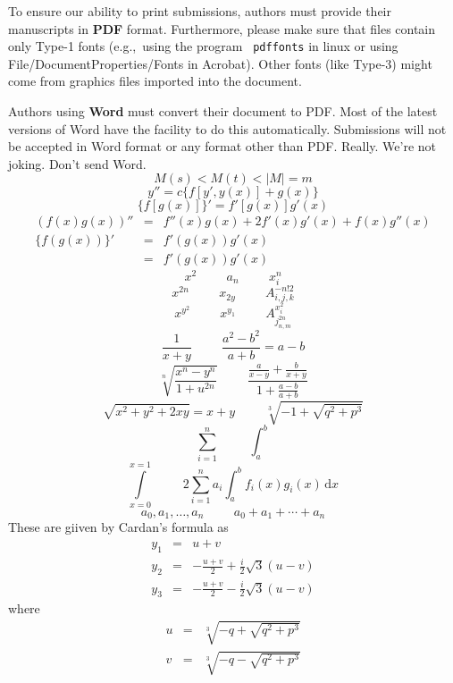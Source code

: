 \documentclass{article}
\begin{document}
\medskip

To ensure our ability to print submissions, authors must provide their
manuscripts in \textbf{PDF} format.  Furthermore, please make sure
that files contain only Type-1 fonts (e.g.,~using the program {\tt
  pdffonts} in linux or using File/DocumentProperties/Fonts in
Acrobat).  Other fonts (like Type-3) might come from graphics files
imported into the document.

Authors using \textbf{Word} must convert their document to PDF.  Most
of the latest versions of Word have the facility to do this
automatically.  Submissions will not be accepted in Word format or any
format other than PDF. Really. We're not joking. Don't send Word.
\[M(s)<M(t)<|M|=m\]
\[y''=c\{f[y',y(x)]+g(x)\}\]\vspace{5pt}
\[\{f[g(x)]\}'=f'[g(x)]g'(x)\]
\begin{eqnarray}
(f(x)g(x))'' &=& f''(x)g(x)+2f'(x)g'(x)+f(x)g''(x)\nonumber\\
 \{f(g(x))\}'&=& f'(g(x))g'(x)\nonumber\\
             &=& f'(g(x))g'(x)\nonumber
\end{eqnarray}
\[x^2\hspace{1cm}a_n\hspace{1cm}x^n_i\]
\[x^{2n}\hspace{1cm}x_{2y}\hspace{1cm}A_{i,j,k}^{-n!2}\]
\[x^{y^2}\hspace{1cm}x^{y_1}\hspace{1cm}A^{x_i^2}_{j^{2n}_{n,m}}\]
\[\frac{1}{x+y}\hspace{1cm}\frac{a^2-b^2}{a+b}=a-b\]
\[\sqrt[n]{\frac{x^n-y^n}{1+u^{2n}}}\hspace{1cm}
\frac{\frac{a}{x-y}+\frac{b}{x+y}}{1+\frac{a-b}{a+b}}\]
\[\sqrt{x^2+y^2+2xy}=x+y\hspace{1cm}\sqrt[3]{-1+\sqrt{q^2+p^3}}\]
\[\sum_{i=1}^n\hspace{1cm}\int_a^b\]
\[\int\limits_{x=0}^{x=1}\hspace{1cm}2\sum_{i=1}^n a_i \int^b_a f_i(x)g_i(x)\,\mathrm{d}x\]
\[a_0,a_1,\ldots,a_n\hspace{1cm}a_0+a_1+\cdots+a_n\]
These are giiven by Cardan's formula as
\begin{eqnarray*}y_1&=&u+v\\ \nonumber
                y_2&=&-\frac{u+v}{2}+\frac{i}{2}\sqrt{3}(u-v)\\ \nonumber
                y_3&=&-\frac{u+v}{2}-\frac{i}{2}\sqrt{3}(u-v) \nonumber
\end{eqnarray*}
where
\begin{eqnarray*}u&=&\sqrt[3]{-q+\sqrt{q^2+p^3}}\\ \nonumber
                v&=&\sqrt[3]{-q-\sqrt{q^2+p^3}} \nonumber
\end{eqnarray*}
\end{document}
